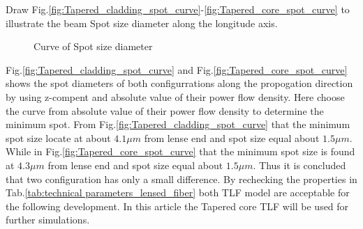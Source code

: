 Draw Fig.\ref{fig:Tapered_cladding_spot_curve}-\ref{fig:Tapered_core_spot_curve} to illustrate the beam Spot size diameter along the longitude axis.
\begin{figure}[!ht]
	\hfill
\caption{Curve of Spot size diameter}
\end{figure}
Fig.\ref{fig:Tapered_cladding_spot_curve} and Fig.\ref{fig:Tapered_core_spot_curve} shows the spot diameters of both configurrations along the propogation direction by using z-compent and absolute value of their power flow density. Here choose the curve from absolute value of their power flow density to determine the minimum spot. From Fig.\ref{fig:Tapered_cladding_spot_curve} that the minimum spot size locate at about $4.1 \mu m$ from lense end and spot size equal about $1.5 \mu m$. While in Fig.\ref{fig:Tapered_core_spot_curve} that the minimum spot size is found at  $4.3 \mu m$ from lense end and spot size equal about $1.5 \mu m$. Thus it is concluded that two configuration has only a small difference. By rechecking the properties in Tab.\ref{tab:technical parameters_lensed_fiber} both TLF model are acceptable for the following development. In this article the Tapered core TLF will be used for further simulations. 
